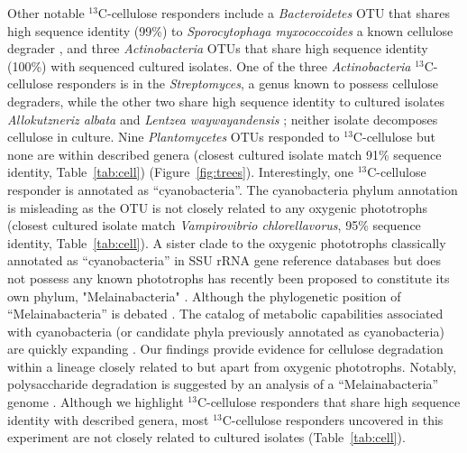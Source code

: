 \par Other notable $^{13}$C-cellulose responders include a \textit{Bacteroidetes}
OTU that shares high sequence identity (99\%) to \textit{Sporocytophaga
myxococcoides} a known cellulose degrader \citep{Vance_1980}, and three
\textit{Actinobacteria} OTUs that share high sequence identity (100\%) with
sequenced cultured isolates. One of the three \textit{Actinobacteria}
$^{13}$C-cellulose responders is in the \textit{Streptomyces}, a genus known to
possess cellulose degraders, while the other two share high sequence identity
to cultured isolates \textit{Allokutzneriz albata} \citep{Labeda_2008,
Tomita_1993} and \textit{Lentzea waywayandensis} \citep{LABEDA_1989,
Labeda_2001}; neither isolate decomposes cellulose in culture. Nine
\textit{Plantomycetes} OTUs responded to $^{13}$C-cellulose but none are within
described genera (closest cultured isolate match 91\% sequence identity,
Table~\ref{tab:cell}) (Figure~\ref{fig:trees}). Interestingly, one
$^{13}$C-cellulose responder is annotated as ``cyanobacteria''.
The cyanobacteria phylum annotation is misleading as the OTU is not closely
related to any oxygenic phototrophs (closest cultured isolate match
\textit{Vampirovibrio chlorellavorus}, 95\% sequence identity,
Table~\ref{tab:cell}). A sister clade to the oxygenic phototrophs classically
annotated as ``cyanobacteria'' in SSU rRNA gene reference databases but does
not possess any known phototrophs has recently been proposed to constitute its own
phylum, "Melainabacteria" \citet{Di_Rienzi_2013}. Although the phylogenetic
position of ``Melainabacteria'' is debated \citep{Soo_2014}. The catalog of
metabolic capabilities associated with cyanobacteria (or candidate phyla
previously annotated as cyanobacteria) are quickly expanding
\citep{Di_Rienzi_2013, Soo_2014}.  Our findings provide evidence for cellulose
degradation within a lineage closely related to but apart from oxygenic
phototrophs. Notably, polysaccharide degradation is suggested by an analysis of
a ``Melainabacteria'' genome \citep{Di_Rienzi_2013}. Although we highlight
$^{13}$C-cellulose responders that share high sequence identity with described
genera, most $^{13}$C-cellulose responders uncovered in this experiment are not
closely related to cultured isolates (Table~\ref{tab:cell}).
